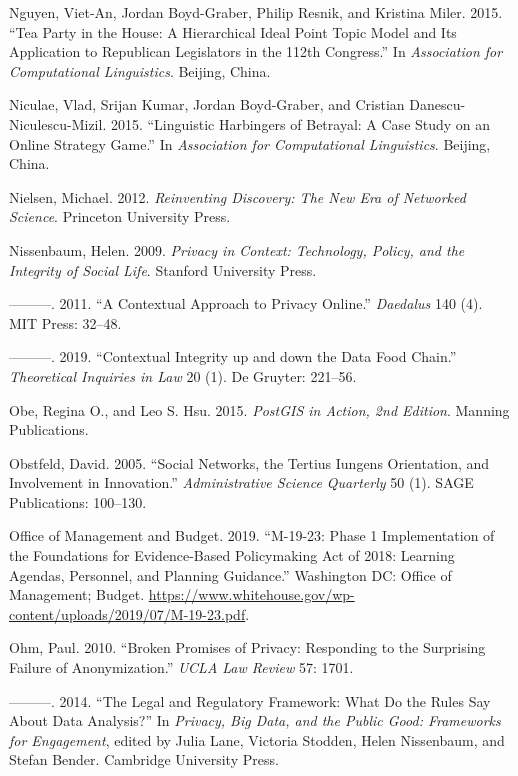 \documentclass[]{krantz}
\begin{document}
\hypertarget{ref-Nguyen:Boyd-Graber:Resnik:Miler-2015}{}
Nguyen, Viet-An, Jordan Boyd-Graber, Philip Resnik, and Kristina Miler.
2015. ``Tea Party in the House: A Hierarchical Ideal Point Topic Model
and Its Application to Republican Legislators in the 112th Congress.''
In \emph{Association for Computational Linguistics}. Beijing, China.

\hypertarget{ref-niculae-15}{}
Niculae, Vlad, Srijan Kumar, Jordan Boyd-Graber, and Cristian
Danescu-Niculescu-Mizil. 2015. ``Linguistic Harbingers of Betrayal: A
Case Study on an Online Strategy Game.'' In \emph{Association for
Computational Linguistics}. Beijing, China.

\hypertarget{ref-nielsen2012reinventing}{}
Nielsen, Michael. 2012. \emph{Reinventing Discovery: The New Era of
Networked Science}. Princeton University Press.

\hypertarget{ref-nissenbaum2009}{}
Nissenbaum, Helen. 2009. \emph{Privacy in Context: Technology, Policy,
and the Integrity of Social Life}. Stanford University Press.

\hypertarget{ref-nissenbaum2011contextual}{}
---------. 2011. ``A Contextual Approach to Privacy Online.''
\emph{Daedalus} 140 (4). MIT Press: 32--48.

\hypertarget{ref-nissenbaum2019contextual}{}
---------. 2019. ``Contextual Integrity up and down the Data Food
Chain.'' \emph{Theoretical Inquiries in Law} 20 (1). De Gruyter:
221--56.

\hypertarget{ref-PostGISInAction}{}
Obe, Regina O., and Leo S. Hsu. 2015. \emph{PostGIS in Action, 2nd
Edition}. Manning Publications.

\hypertarget{ref-obstfeld2005social}{}
Obstfeld, David. 2005. ``Social Networks, the Tertius Iungens
Orientation, and Involvement in Innovation.'' \emph{Administrative
Science Quarterly} 50 (1). SAGE Publications: 100--130.

\hypertarget{ref-OfficeofManagementandBudget}{}
Office of Management and Budget. 2019. ``M-19-23: Phase 1 Implementation
of the Foundations for Evidence-Based Policymaking Act of 2018: Learning
Agendas, Personnel, and Planning Guidance.'' Washington DC: Office of
Management; Budget.
\url{https://www.whitehouse.gov/wp-content/uploads/2019/07/M-19-23.pdf}.

\hypertarget{ref-ohm2010broken}{}
Ohm, Paul. 2010. ``Broken Promises of Privacy: Responding to the
Surprising Failure of Anonymization.'' \emph{UCLA Law Review} 57: 1701.

\hypertarget{ref-Ohm2014}{}
---------. 2014. ``The Legal and Regulatory Framework: What Do the Rules
Say About Data Analysis?'' In \emph{Privacy, Big Data, and the Public
Good: Frameworks for Engagement}, edited by Julia Lane, Victoria
Stodden, Helen Nissenbaum, and Stefan Bender. Cambridge University
Press.
\end{document}
